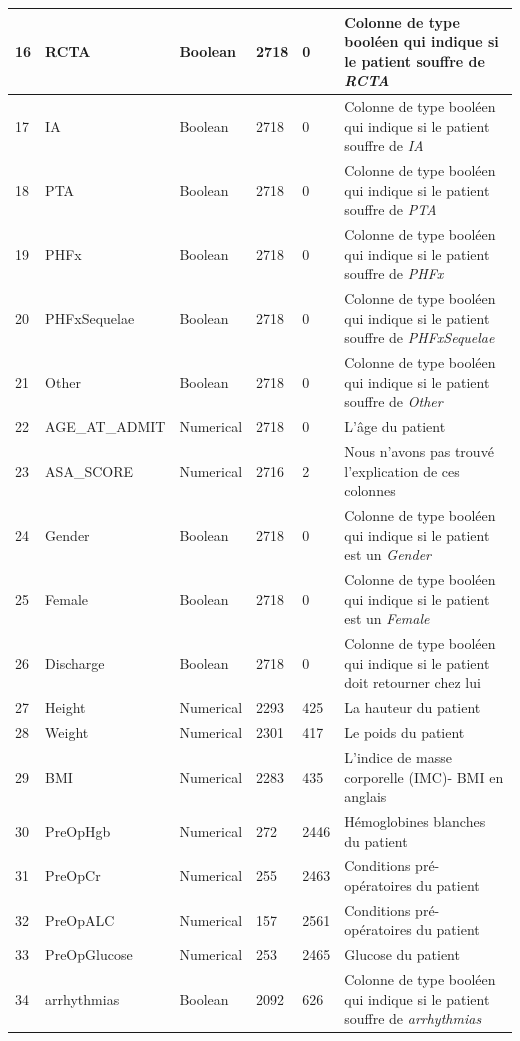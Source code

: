\documentclass[12pt, french]{report}
\begin{document}
\begin{longtable}{| p{} | p{} | p{} | p{}  | p{} | p{} |  }
16 &	RCTA & Boolean & 2718 & 0& Colonne de type booléen qui indique si le patient souffre  de \textit{RCTA} \\ \hline 
17 &	IA & Boolean & 2718 & 0& Colonne de type booléen qui indique si le patient souffre  de \textit{IA} \\ \hline 
18 &	PTA & Boolean & 2718 & 0& Colonne de type booléen qui indique si le patient souffre  de \textit{PTA} \\ \hline 
19 &	PHFx & Boolean & 2718 & 0& Colonne de type booléen qui indique si le patient souffre  de \textit{PHFx} \\ \hline 
20 &	PHFxSequelae & Boolean & 2718 & 0& Colonne de type booléen qui indique si le patient souffre  de \textit{PHFxSequelae} \\ \hline 
21 &	Other & Boolean & 2718 & 0& Colonne de type booléen qui indique si le patient souffre  de \textit{Other} \\ \hline 
22 &	AGE\_AT\_ADMIT & Numerical & 2718 & 0 & L'âge du patient \\ \hline 
23 &	ASA\_SCORE & Numerical & 2716 & 2 & Nous n’avons pas trouvé l’explication de ces colonnes \\ \hline 
24 &	Gender & Boolean & 2718 & 0& Colonne de type booléen qui indique si le patient  est un \textit{Gender} \\ \hline 
25 &	Female & Boolean & 2718 & 0& Colonne de type booléen qui indique si le patient  est un \textit{Female} \\ \hline 
26 &	Discharge & Boolean & 2718 & 0& Colonne de type booléen qui indique si le patient  doit retourner chez lui \\ \hline 
27 &	Height & Numerical & 2293 & 425 & La hauteur du patient \\ \hline 
28 &	Weight & Numerical & 2301 & 417 & Le poids du patient \\ \hline 
29 &	BMI & Numerical & 2283 & 435 & L'indice de masse corporelle (IMC)- BMI en anglais \\ \hline 
30 &	PreOpHgb & Numerical & 272 & 2446 & Hémoglobines blanches du patient \\ \hline 
31 &	PreOpCr & Numerical & 255 & 2463 & Conditions pré-opératoires du patient \\ \hline 
32 &	PreOpALC & Numerical & 157 & 2561 &  Conditions pré-opératoires du patient \\ \hline 
33 &	PreOpGlucose & Numerical & 253 & 2465 & Glucose du patient \\ \hline 
34 &	arrhythmias & Boolean & 2092 & 626& Colonne de type booléen qui indique si le patient souffre  de \textit{arrhythmias} \\ \hline 

\end{longtable}
\end{document}
